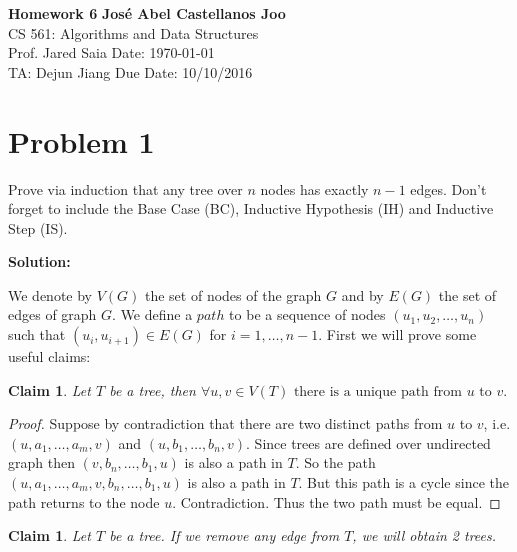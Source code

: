 \documentclass[a4paper, 11pt]{article}
\newtheorem{claim}[theorem]{Claim}
\newcommand{\solution}{\textbf{Solution:}}
\begin{document}
\noindent
\large\textbf{Homework 6} \hfill \textbf{Jos\'e Abel Castellanos Joo} \\
\normalsize CS 561: Algorithms and Data Structures \\
Prof. Jared Saia \hfill Date: \today \\
TA: Dejun Jiang \hfill Due Date: 10/10/2016

\section*{Problem 1}

Prove via induction that any tree over $n$ nodes has exactly $n - 1$ edges. Don't forget to include the Base Case (BC), Inductive Hypothesis (IH) and Inductive Step (IS).

\solution

We denote by $V(G)$ the set of nodes of the graph $G$ and by $E(G)$ the set of edges of graph $G$. We define a $path$ to be a sequence of nodes $(u_1, u_2, \dots, u_n)$ such that $(u_i, u_{i + 1}) \in E(G)$ for $i = 1, \dots, n-1$. First we will prove some useful claims:

\begin{claim} \label{first}
	Let $T$ be a tree, then $\forall u, v \in V(T) \text{ there is a unique path from }  u \text{ to } v.$ 
\end{claim}

\begin{proof}
	Suppose by contradiction that there are two distinct paths from $u$ to $v$, i.e. $(u, a_1, \dots, a_m, v)$ and $(u, b_1, \dots, b_n, v)$. Since trees are defined over undirected graph then $(v, b_n, \dots, b_1, u)$ is also a path in $T$. So the path $(u, a_1, \dots, a_m, v, b_n, \dots, b_1, u)$ is also a path in $T$. But this path is a cycle since the path returns to the node $u$. Contradiction. Thus the two path must be equal. 
\end{proof}

\begin{claim} \label{second}
	Let $T$ be a tree. If we remove any edge from $T$, we will obtain 2 trees. 
\end{claim}
\end{document}
